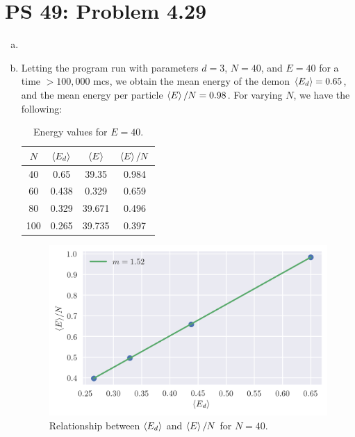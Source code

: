 \documentclass[12pt,a4paper,twocolumn]{article}
\begin{document}
\setcounter{page}{1}

\section*{PS 49: Problem 4.29}
\bigskip

\begin{enumerate}[(a)]

\item

\item Letting the program run with parameters $d = 3$, $N = 40$, and $E = 40$ for a time $> 100,000$ mcs, we obtain the mean energy of the demon $\ev{E_d} = 0.65$, and the mean energy per particle $\ev{E}/N = 0.98$. For varying $N$, we have the following:

\begin{table}[h!]
	\centering
	\caption{Energy values for $E = 40$.}
	\begin{tabular}{|c|c|c|c|}
		\hline
		$N$ & $\ev{E_d}$ & $\ev{E}$ & $\ev{E}/N$ \\ \hline
		40 & 0.65 & 39.35 & 0.984 \\
		60 & 0.438 & 0.329 & 0.659 \\
		80 & 0.329 & 39.671 & 0.496 \\
		100 & 0.265 & 39.735 & 0.397 \\ \hline
	\end{tabular}
	\label{tab:E=40}
\end{table}

\begin{figure}[h!]
	\centering
	\includegraphics[width=\linewidth]{E=40.png}
	\caption{Relationship between $\ev{E_d}$ and $\ev{E}/N$ for $N=40$.}
	\label{fig:E=40}
\end{figure}


\end{enumerate}
\end{document}
